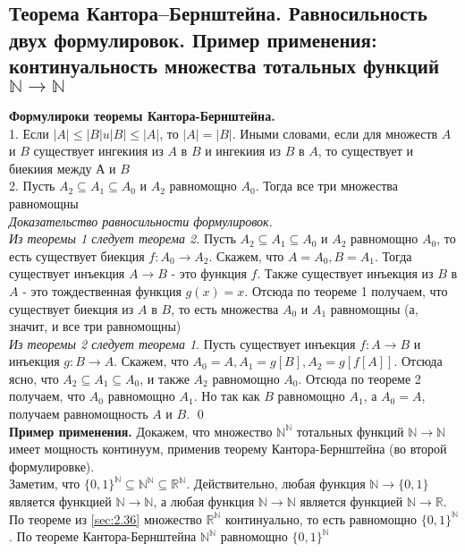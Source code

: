 \documentclass[a4paper]{article}
\begin{document}
\subsection{Теорема Кантора–Бернштейна. Равносильность двух формулировок. Пример применения: континуальность множества тотальных функций $\mathbb{N}\rightarrow\mathbb{N}$}
\textbf{Формулироки теоремы Кантора-Бернштейна.}\\[2mm]
 1. Если $|A| \leqslant|B| u|B| \leqslant|A|$, то $|A|=|B|$. Иными словами, если для множеств $A$ и $B$ существует ингекиия из $A$ в $B$ и ингекиия из $B$ в $A$, то существует и биекиия между $А$ и $B$\\[2mm]
 2. Пусть $A_{2} \subseteq A_{1} \subseteq A_{0}$ и $A_{2}$ равномощно $A_{0}$. Тогда все три множества равномощны\\[2mm]
\textit{Доказательство равносильности формулировок.}\\[2mm]
 \textit{Из теоремы 1 следует теорема 2.} Пусть $A_{2} \subseteq A_{1} \subseteq A_{0}$ и $A_{2}$ равномощно $A_{0}$, то есть существует биекция $f: A_{0} \rightarrow A_{2}$. Скажем, что $A=A_{0}, B=A_{1}$. Тогда существует инъекция $A \rightarrow B$ - это функция $f$. Также существует инъекция из $B$ в $A$ - это тождественная функция $g(x)=x$. Отсюда по теореме 1 получаем, что существует биекция из $A$ в $B$, то есть множества $A_{0}$ и $A_{1}$ равномощны (а, значит, и все три равномощны)\\[2mm]
 \textit{Из теоремы 2 следует теорема 1}. Пусть существует инъекция $f: A \rightarrow B$ и инъекция $g: B \rightarrow A$. Скажем, что $A_{0}=A, A_{1}=g[B], A_{2}=g[f[A]]$. Отсюда ясно, что $A_{2} \subseteq A_{1} \subseteq A_{0}$, и также $A_{2}$ равномощно $A_{0}$. Отсюда по теореме 2 получаем, что $A_{0}$ равномощно $A_{1}$. Но так как $B$ равномощно $A_{1}$, а $A_{0}=A$, получаем равномощность $A$ и $B$. \qed\\[2mm]
\textbf{Пример применения.} Докажем, что множество $\mathbb{N}^{\mathbb{N}}$ тотальных функций $\mathbb{N}\rightarrow\mathbb{N}$ имеет мощность континуум, применив теорему Кантора-Бернштейна (во второй формулировке).\\[2mm]
 Заметим, что $\{0,1\}^{\mathbb{N}} \subseteq \mathbb{N}^{\mathbb{N}} \subseteq \mathbb{R}^{\mathbb{N}}$. Действительно, любая функция $\mathbb{N} \rightarrow\{0,1\}$ является функцией $\mathbb{N} \rightarrow \mathbb{N}$, а любая функция $\mathbb{N} \rightarrow \mathbb{N}$ является функцией $\mathbb{N} \rightarrow \mathbb{R}$. По теореме из \ref{sec:2.36} множество $\mathbb{R}^{\mathbb{N}}$ континуально, то есть равномощно $\{0,1\}^{\mathbb{N}}$. По теореме Кантора-Бернштейна $\mathbb{N}^{\mathbb{N}}$ равномощно $\{0,1\}^{\mathbb{N}}$
\end{document}
